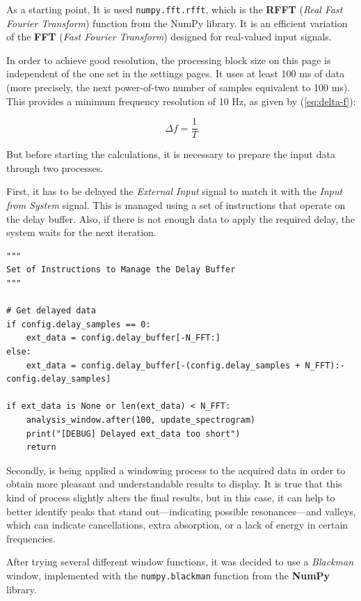 As a starting point, It is used \texttt{numpy.fft.rfft}, which is the \textbf{RFFT} (\textit{Real Fast Fourier Transform}) function from the NumPy library. It is an efficient variation of the \textbf{FFT} (\textit{Fast Fourier Transform}) designed for real-valued input signals.

In order to achieve good resolution, the processing block size on this page is independent of the one set in the settings pages. It uses at least 100 ms of data (more precisely, the next power-of-two number of samples equivalent to 100 ms). This provides a minimum frequency resolution of 10 Hz, as given by
(\ref{eq:delta-f}):

\begin{equation}
	\label{eq:delta-f}
	\Delta f = \frac{1}{T}
\end{equation}

But before starting the calculations, it is necessary to prepare the input data through two processes.

First, it has to be delayed the \textit{External Input} signal to match it with the \textit{Input from System} signal. This is managed using a set of instructions that operate on the delay buffer. Also, if there is not enough data to apply the required delay, the system waits for the next iteration.

\begin{verbatim}
"""
Set of Instructions to Manage the Delay Buffer
"""

# Get delayed data
if config.delay_samples == 0:
	ext_data = config.delay_buffer[-N_FFT:]
else:
	ext_data = config.delay_buffer[-(config.delay_samples + N_FFT):-config.delay_samples]

if ext_data is None or len(ext_data) < N_FFT:
	analysis_window.after(100, update_spectrogram)
	print("[DEBUG] Delayed ext_data too short")
	return	
\end{verbatim}

Secondly, is being applied a windowing process to the acquired data in order to obtain more pleasant and understandable results to display. It is true that this kind of process slightly alters the final results, but in this case, it can help to better identify peaks that stand out—indicating possible resonances—and valleys, which can indicate cancellations, extra absorption, or a lack of energy in certain frequencies.

After trying several different window functions, it was decided to use a \textit{Blackman} window, implemented with the \texttt{numpy.blackman} function from the \textbf{NumPy} library.

